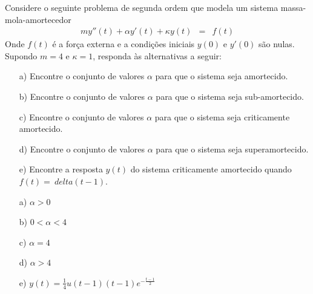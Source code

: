 \begin{Exercise}
 Considere o seguinte problema de segunda ordem que modela um sistema massa-mola-amortecedor
\begin{eqnarray*}
 m y''(t) +\alpha y'(t) + \kappa y(t) &=& f(t)
 \end{eqnarray*}
Onde $f(t)$ é a força externa e a condições iniciais $y(0)$ e $y'(0)$ são nulas.
 Supondo $m=4$ e $\kappa=1$, responda às alternativas a seguir:
 \begin{itemize}
  \item [a)] Encontre o conjunto de valores $\alpha$ para que o sistema seja amortecido.
  \item [b)] Encontre o conjunto de valores $\alpha$ para que o sistema seja sub-amortecido.
  \item [c)] Encontre o conjunto de valores $\alpha$ para que o sistema seja criticamente amortecido.
  \item [d)] Encontre o conjunto de valores $\alpha$ para que o sistema seja superamortecido. 
  \item [e)] Encontre a resposta $y(t)$ do sistema criticamente amortecido quando $f(t)=\ delta(t-1)$.
 \end{itemize}

\end{Exercise}
\begin{Answer}
 \begin{itemize}
  \item [a)] $\alpha>0$
  \item [b)] $0<\alpha<4$
  \item [c)] $\alpha=4$
  \item [d)] $\alpha>4$
  \item [e)] $y(t)=\frac{1}{4} u(t-1) (t-1) e^{-\frac{t-1}{2}}$
 \end{itemize}

\end{Answer}



